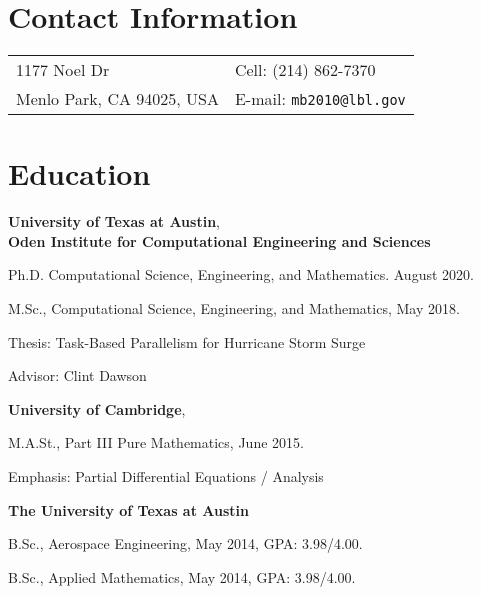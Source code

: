 \documentclass[margin,line]{res}
\newenvironment{list1}{
  \begin{list}{\ding{113}}{%
      \setlength{\itemsep}{0in}
      \setlength{\parsep}{0in} \setlength{\parskip}{0in}
      \setlength{\topsep}{0in} \setlength{\partopsep}{0in}
      \setlength{\leftmargin}{0.17in}}}{\end{list}}
\begin{document}
 

\begin{resume}

\section{\sc Contact Information} 
\begin{tabular}{@{}p{3.25in}p{4in}}
1177 Noel Dr & { Cell:} (214) 862-7370 \\
Menlo Park, CA 94025, USA & {E-mail:} {\tt mb2010@lbl.gov}
\end{tabular} 


\section{\sc Education} 

\textbf{University of Texas at Austin}, \\
\textbf{Oden Institute for Computational Engineering and Sciences} \\ 
\vspace*{-.1in} 

\begin{list1} 
\item[] Ph.D. Computational Science, Engineering, and Mathematics. August 2020.
\item[] M.Sc., Computational Science, Engineering, and Mathematics, May 2018.
\item[] Thesis: Task-Based Parallelism for Hurricane Storm Surge
\item[] Advisor: Clint Dawson
\end{list1}

\textbf{University of Cambridge}, \\
\vspace*{-.1in}

\begin{list1}
\item[] M.A.St., Part III Pure Mathematics, June 2015.
\item[] Emphasis: Partial Differential Equations / Analysis
\end{list1}

\textbf{The University of Texas at Austin} \\

\vspace*{-.1in}
\begin{list1}
\item[] B.Sc., Aerospace Engineering, May 2014, GPA: 3.98/4.00.
\item[] B.Sc., Applied Mathematics, May 2014, GPA: 3.98/4.00.
\end{list1}



\end{resume}
\end{document}
